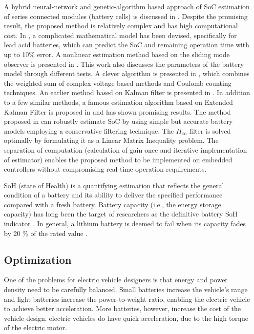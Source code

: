  A hybrid neural-network and genetic-algorithm based approach of SoC estimation  of  series  connected  modules  (battery  cells)  is discussed in \cite{ZS_11}. Despite the promising result, the proposed method is relatively complex and has high computational cost. In \cite{ZS_12}, a complicated mathematical model has been devised, specifically for lead acid batteries, which can predict the SoC and remaining operation time with up to 10\% error. A nonlinear estimation method based on the sliding mode observer is presented in \cite{ZS_13}. This work also discusses the parameters of the  battery  model  through  different  tests.  A  clever  algorithm is  presented  in \cite{ZS_14}, which  combines  the  weighted  sum  of complex  voltage  based  methods  and Coulomb  counting  techniques.  An  earlier  method  based  on Kalman  filter  is  presented  in \cite{ZS_15,ZS_16,ZS_17,ZS_18}.  In  addition  to  a few similar methods, a famous estimation algorithm based on Extended Kalman Filter is proposed in \cite{ZS_19,ZS_20,ZS_21,ZS_22,ZS_23,ZS_24} and has shown promising results. The method proposed in \cite{ZS_shaheer} can robustly estimate SoC by using simple but accurate battery models employing a conservative filtering technique. The $H_\infty$ filter is  solved  optimally  by  formulating  it  as  a Linear Matrix Inequality problem. The separation of computation (calculation of gain once and iterative implementation of estimator) enables the proposed method to be implemented on embedded controllers without compromising real-time operation requirements.

SoH (state of Health) is a quantifying estimation that reflects the general
condition of a battery and its ability to deliver the specified
performance compared with a fresh battery. Battery
capacity (i.e., the energy storage capacity) has long been the
target of researchers as the definitive battery SoH indicator \cite{ZS_yu}. In general, a lithium battery is deemed to fail when its capacity
fades by 20 \% of the rated value \cite{ZS_pas}.

\subsection{Optimization}

One of the problems for electric vehicle designers is that energy and power density need to be carefully balanced. Small batteries increase the vehicle’s range and light batteries increase the power-to-weight ratio, enabling the electric vehicle to achieve better acceleration. More batteries, however, increase the cost of the vehicle design. electric vehicles do have quick acceleration, due to the high torque of the electric motor.

